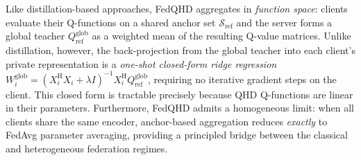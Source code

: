 Like distillation-based approaches, FedQHD aggregates in \emph{function space}: clients evaluate their Q-functions on a shared anchor set $\mathcal{S}_{\mathrm{ref}}$ and the server forms a global teacher $Q^{\mathrm{glob}}_{\mathrm{ref}}$ as a weighted mean of the resulting Q-value matrices.
Unlike distillation, however, the back-projection from the global teacher into each client's private representation is a \emph{one-shot closed-form ridge regression}
$W^{\mathrm{glob}}_i = \left(X_i^\mathrm{H} X_i + \lambda I\right)^{-1} X_i^\mathrm{H} Q^{\mathrm{glob}}_{\mathrm{ref}}$,
requiring no iterative gradient steps on the client.
This closed form is tractable precisely because QHD Q-functions are linear in their parameters.
Furthermore, FedQHD admits a homogeneous limit: when all clients share the same encoder, anchor-based aggregation reduces \emph{exactly} to FedAvg parameter averaging, providing a principled bridge between the classical and heterogeneous federation regimes.

